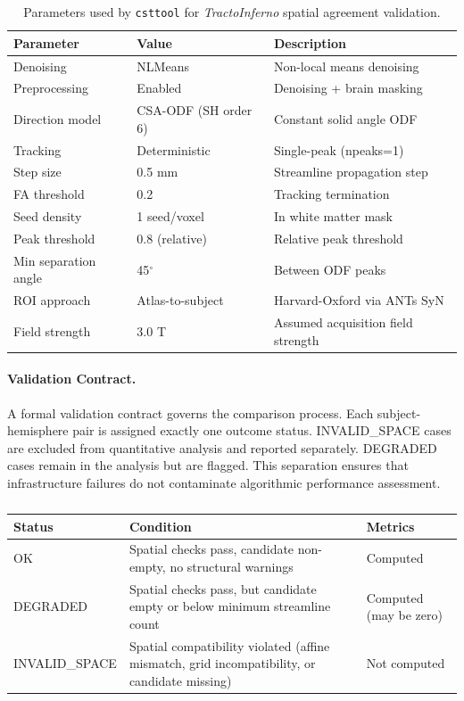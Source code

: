 \begin{table}[h]
	\centering
	\caption{Parameters used by \texttt{csttool} for \textit{TractoInferno} spatial agreement validation.}
	\begin{tabular}{lll}
		\hline
		Parameter & Value & Description \\
		\hline
		Denoising & NLMeans & Non-local means denoising \\
		Preprocessing & Enabled & Denoising + brain masking \\
		Direction model & CSA-ODF (SH order 6) & Constant solid angle ODF \\
		Tracking & Deterministic & Single-peak (npeaks=1) \\
		Step size & 0.5 mm & Streamline propagation step \\
		FA threshold & 0.2 & Tracking termination \\
		Seed density & 1 seed/voxel & In white matter mask \\
		Peak threshold & 0.8 (relative) & Relative peak threshold \\
		Min separation angle & 45$^\circ$ & Between ODF peaks \\
		ROI approach & Atlas-to-subject & Harvard-Oxford via ANTs SyN \\
		Field strength & 3.0 T & Assumed acquisition field strength \\
		\hline
	\end{tabular}
\end{table}

\paragraph{Validation Contract.}

A formal validation contract governs the comparison process. Each subject-hemisphere pair is assigned exactly one outcome status. INVALID\_SPACE cases are excluded from quantitative analysis and reported separately. DEGRADED cases remain in the analysis but are flagged. This separation ensures that infrastructure failures do not contaminate algorithmic performance assessment.

\begin{table}[h]
	\centering
	\caption{}
	\begin{tabular}{lll}
		\hline
		Status & Condition & Metrics \\
		\hline
		OK & Spatial checks pass, candidate non-empty, no structural warnings & Computed \\
		DEGRADED & Spatial checks pass, but candidate empty or below minimum streamline count & Computed (may be zero) \\
		INVALID\_SPACE & Spatial compatibility violated (affine mismatch, grid incompatibility, or candidate missing) & Not computed \\
		\hline
	\end{tabular}
\end{table}

